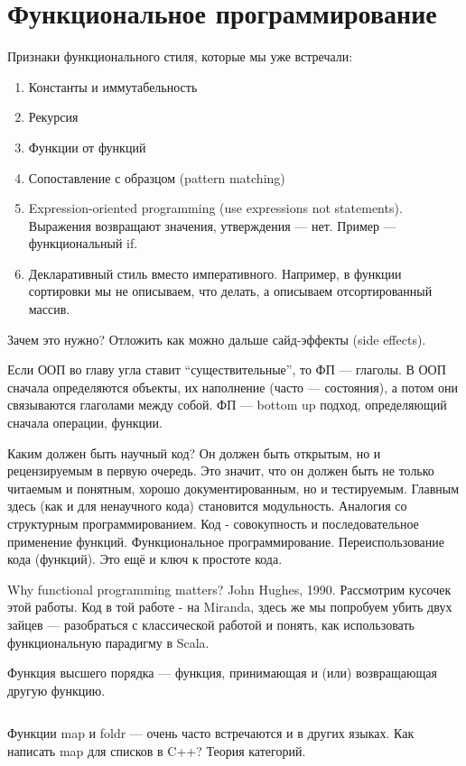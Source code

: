 \documentclass{book}
\begin{document}
\section{Функциональное программирование}

Признаки функционального стиля, которые мы уже встречали:
\begin{enumerate}
    \item Константы и иммутабельность
    \item Рекурсия
    \item Функции от функций
    \item Сопоставление с образцом (pattern matching)
    \item Expression-oriented programming (use expressions not statements). Выражения возвращают
        значения, утверждения --- нет. Пример --- функциональный if.
    \item Декларативный стиль вместо императивного. Например, в функции сортировки мы не описываем,
        что делать, а описываем отсортированный массив.
\end{enumerate}
Зачем это нужно? Отложить как можно дальше сайд-эффекты (side effects).

Если ООП во главу угла ставит ``существительные'', то ФП --- глаголы. В ООП сначала определяются
объекты, их наполнение (часто --- состояния), а потом они связываются глаголами между собой. ФП ---
bottom up подход, определяющий сначала операции, функции.

Каким должен быть научный код? Он должен быть открытым, но и рецензируемым в первую очередь. Это
значит, что он должен быть не только читаемым и понятным, хорошо документированным, но и
тестируемым.  Главным здесь (как и для ненаучного кода) становится модульность. Аналогия со
структурным программированием. Код - совокупность и последовательное применение функций.
Функциональное программирование. Переиспользование кода (функций). Это ещё и ключ к простоте кода.

Why functional programming matters? John Hughes, 1990. Рассмотрим кусочек этой работы. Код в той
работе - на Miranda, здесь же мы попробуем убить двух зайцев --- разобраться с классической работой
и понять, как использовать функциональную парадигму в Scala.

Функция высшего порядка --- функция, принимающая и (или) возвращающая другую функцию.

\inputminted{scala}{whyfpmatters.scala}

Функции map и foldr --- очень часто встречаются и в других языках. Как написать map для списков в
C++? Теория категорий.
\end{document}
